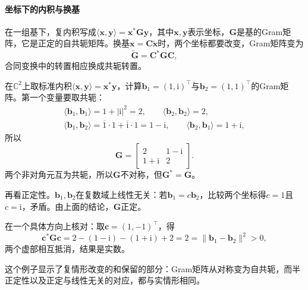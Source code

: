 \paragraph{坐标下的内积与换基}
在一组基下，复内积写成$\langle\bm x,\bm y\rangle=\bm x^*\bm G\bm y$，其中$\bm x,\bm y$表示坐标，$\bm G$是基的Gram矩阵，它是正定的自共轭矩阵。换基$\bm x=\bm C\widetilde{\bm x}$时，两个坐标都要改变，Gram矩阵变为
\[
 \widetilde{\bm G}=\bm C^*\bm G\bm C,
\]
合同变换中的转置相应换成共轭转置。
\begin{example}[复空间中的Gram矩阵]
\label{ex:ls-complex-gram}
在$\mathbb C^2$上取标准内积$\langle\bm x,\bm y\rangle=\bm x^*\bm y$，计算$\bm b_1=(1,\mathrm i)^\top$与$\bm b_2=(1,1)^\top$的Gram矩阵。第一个变量要取共轭：
\[
 \begin{gathered}
 \langle\bm b_1,\bm b_1\rangle=1+|\mathrm i|^2=2,\qquad\langle\bm b_2,\bm b_2\rangle=2,\\
 \langle\bm b_1,\bm b_2\rangle=\overline1\cdot1+\overline{\mathrm i}\cdot1=1-\mathrm i,\qquad\langle\bm b_2,\bm b_1\rangle=1+\mathrm i,
 \end{gathered}
\]
所以
\[
 \bm G=\begin{bmatrix}2&1-\mathrm i\\1+\mathrm i&2\end{bmatrix}.
\]
两个非对角元互为共轭，所以$\bm G$不对称，但$\bm G^*=\bm G$。

再看正定性。$\bm b_1,\bm b_2$在复数域上线性无关：若$\bm b_1=c\bm b_2$，比较两个坐标得$c=1$且$c=\mathrm i$，矛盾。由上面的结论，$\bm G$正定。

在一个具体方向上核对：取$\bm c=(1,-1)^\top$，得
\[
 \bm c^*\bm G\bm c=2-(1-\mathrm i)-(1+\mathrm i)+2=2=\lVert\bm b_1-\bm b_2\rVert^2>0,
\]
两个虚部相互抵消，结果是实数。

这个例子显示了复情形改变的和保留的部分：Gram矩阵从对称变为自共轭，而半正定性以及正定与线性无关的对应，都与实情形相同。
\end{example}
